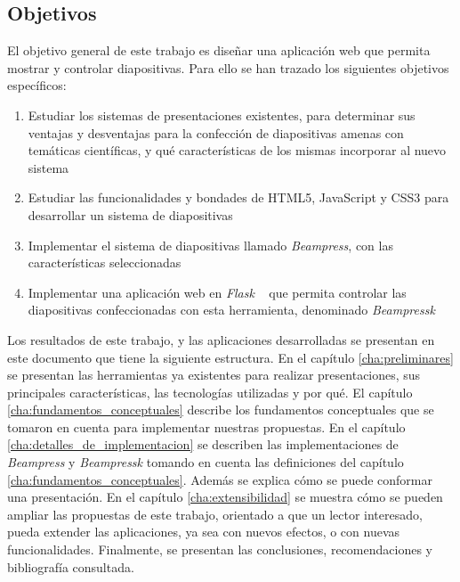 \begin{introduction}
	\section*{Objetivos} %
	\label{sec:objetivos}

		El objetivo general de este trabajo es diseñar una aplicación web que permita mostrar y controlar diapositivas. Para ello se han trazado los siguientes objetivos específicos:

		\begin{enumerate}
			\item Estudiar los sistemas de presentaciones existentes, para determinar sus ventajas y desventajas para la confección de diapositivas amenas con temáticas científicas, y qué características de los mismas incorporar al nuevo sistema
			\item Estudiar las funcionalidades y bondades de HTML5, JavaScript y CSS3 para desarrollar un sistema de diapositivas
			\item Implementar el sistema de diapositivas llamado \textit{Beampress}, con las características seleccionadas
			\item Implementar una aplicación web en \textit{Flask} ~\cite{flask, flaskbook} que permita controlar las diapositivas confeccionadas con esta herramienta, denominado \textit{Beampressk}
		\end{enumerate}

	
		Los resultados de este trabajo, y las aplicaciones desarrolladas se presentan en este documento que tiene la siguiente estructura. En el capítulo \ref{cha:preliminares} se presentan las herramientas ya existentes para realizar presentaciones, sus principales características, las tecnologías utilizadas y por qué. El capítulo \ref{cha:fundamentos_conceptuales} describe los fundamentos conceptuales que se tomaron en cuenta para implementar nuestras propuestas. En el capítulo \ref{cha:detalles_de_implementacion} se describen las implementaciones de \textit{Beampress} y \textit{Beampressk} tomando en cuenta las definiciones del capítulo \ref{cha:fundamentos_conceptuales}. Además se explica cómo se puede conformar una presentación. En el capítulo \ref{cha:extensibilidad} se muestra cómo se pueden ampliar las propuestas de este trabajo, orientado a que un lector interesado, pueda extender las aplicaciones, ya sea con nuevos efectos, o con nuevas funcionalidades. Finalmente, se presentan las conclusiones, recomendaciones y bibliografía consultada.





\end{introduction}




